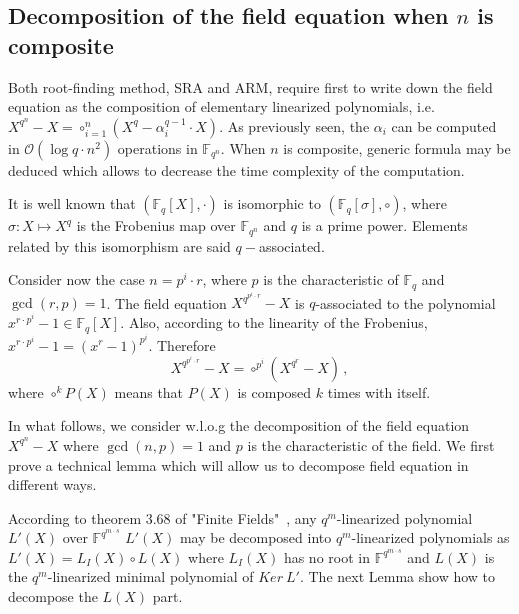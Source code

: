 \documentclass{sig-alternate}
\newcommand{\qq}{q}
\begin{document}
\subsection{Decomposition of the field equation when $n$ is composite}

\noindent Both root-finding method, SRA and ARM, require first to write down the field equation as the composition of elementary linearized polynomials, i.e. $X^{q^n}-X=\circ_{i=1}^n (X^q-\alpha_i^{q-1} \cdot X)$.
As previously seen, the $\alpha_i$ can be computed in $\mathcal{O}(\log q \cdot n^2)$ operations in $\mathbb{F}_{q^n}$. When $n$ is composite, generic formula may be deduced 
which allows to decrease the time complexity of the computation.

\medskip   

\noindent It is well known that $(\mathbb{F}_q[X],\cdot)$ is isomorphic to  $(\mathbb{F}_q[\sigma], \circ)$, where $\sigma: X \mapsto X^q$ is the Frobenius map over $\mathbb{F}_{q^n}$  and $q$ is a prime power. 
Elements related by this isomorphism are said $q-$associated. 

\medskip

\noindent Consider now the case $n=p^i \cdot r$, where $p$ is the characteristic of $\mathbb{F}_q$ and $\gcd(r,p)=1$.  
The field equation $X^{q^{p^i \cdot r}}-X$ is $q$-associated to the polynomial $x^{r\cdot p^i}-1 \in \mathbb{F}_q[X]$. Also, according
 to the linearity of the Frobenius,  $x^{r \cdot p^i}-1=(x^r-1)^{p^i}$. Therefore 
$$X^{q^{p^i \cdot r}}-X=\circ^{p^i} (X^{q^r}-X)\,,$$
where $\circ^{k} P(X)$ means that $P(X)$ is composed $k$ times with itself. 

\medskip

\noindent In what follows, we consider w.l.o.g the decomposition of the field equation $X^{\qq^n}-X$ where $\gcd(n,p)=1$ and $p$ is the characteristic of the field. We first prove a technical lemma which will allow us to decompose field equation in different ways.

\medskip

According to theorem 3.68 of "Finite Fields"~\cite{LildNiderreiter}, any $\qq^m$-linearized polynomial $L'(X)$ over $\mathbb{F}^{\qq^{m \cdot s}}$ $L'(X)$ may be decomposed into $\qq^m$-linearized polynomials as $L'(X)=L_I(X) \circ L(X)$ where $L_I(X)$ has no root in $\mathbb{F}^{\qq^{m \cdot s}}$ and  $L(X)$ is the $\qq^m$-linearized minimal polynomial of $Ker~L'$. The next Lemma show how to decompose the $L(X)$ part.
\end{document}
